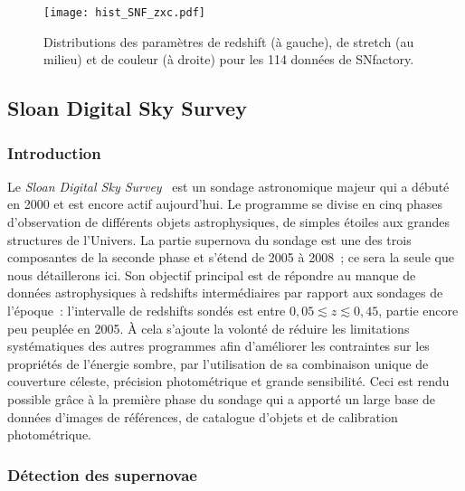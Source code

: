 \documentclass[../main/main.tex]{subfiles}
\begin{document}
\begin{figure}[ht]
    \centering
    \texttt{[image: hist\_SNF\_zxc.pdf]}
    \captionsetup{justification=centering}
    \caption{Distributions des paramètres de redshift (à gauche), de stretch (au
    milieu) et de couleur (à droite) pour les 114 données de SNfactory.}
    \label{fig:snfhist}
\end{figure}

\subsection{Sloan Digital Sky Survey}\label{ssec:sdss}
\subsubsection{Introduction}\label{sssec:sdssintro}

Le \textit{Sloan Digital Sky Survey}~\citep[SDSS,][]{frieman2008, sako2008,
sako2018} est un sondage astronomique majeur qui a débuté en 2000 et est encore
actif aujourd'hui. Le programme se divise en cinq phases d'observation de
différents objets astrophysiques, de simples étoiles aux grandes structures de
l'Univers. La partie supernova du sondage est une des trois composantes de la
seconde phase et s'étend de 2005 à 2008~; ce sera la seule que nous détaillerons
ici. Son objectif principal est de répondre au manque de données astrophysiques
à redshifts intermédiaires par rapport aux sondages de l'époque~: l'intervalle
de redshifts sondés est entre $0,05 \lesssim z \lesssim 0,45$, partie encore peu
peuplée en 2005. À cela s'ajoute la volonté de réduire les limitations
systématiques des autres programmes afin d'améliorer les contraintes sur les
propriétés de l'énergie sombre, par l'utilisation de sa combinaison unique de
couverture céleste, précision photométrique et grande sensibilité. Ceci est
rendu possible grâce à la première phase du sondage qui a apporté un large base
de données d'images de références, de catalogue d'objets et de calibration
photométrique.

\subsubsection{Détection des supernovae}\label{sssec:sdssdetec}
\end{document}
